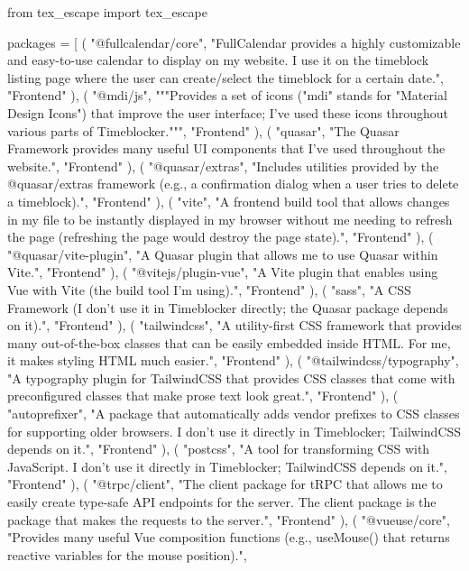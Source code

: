 \documentclass[12pt]{report}
\begin{document}
\begin{pycode}
from tex_escape import tex_escape

packages = [
	(
		"@fullcalendar/core",
		"FullCalendar provides a highly customizable and easy-to-use calendar to display on my website. I use it on the timeblock listing page where the user can create/select the timeblock for a certain date.",
		"Frontend"
	),
	(
		"@mdi/js",
		"""Provides a set of icons ("mdi" stands for "Material Design Icons") that improve the user interface; I've used these icons throughout various parts of Timeblocker.""",
		"Frontend"
	),
	(
		"quasar",
		"The Quasar Framework provides many useful UI components that I've used throughout the website.",
		"Frontend"
	),
	(
		"@quasar/extras",
		"Includes utilities provided by the @quasar/extras framework (e.g., a confirmation dialog when a user tries to delete a timeblock).",
		"Frontend"
	),
	(
		"vite",
		"A frontend build tool that allows changes in my file to be instantly displayed in my browser without me needing to refresh the page (refreshing the page would destroy the page state).",
		"Frontend"
	),
	(
		"@quasar/vite-plugin",
		"A Quasar plugin that allows me to use Quasar within Vite.",
		"Frontend"
	),
	(
		"@vitejs/plugin-vue",
		"A Vite plugin that enables using Vue with Vite (the build tool I'm using).",
		"Frontend"
	),
	(
		"sass",
		"A CSS Framework (I don't use it in Timeblocker directly; the Quasar package depends on it).",
		"Frontend"
	),
	(
		"tailwindcss",
		"A utility-first CSS framework that provides many out-of-the-box classes that can be easily embedded inside HTML. For me, it makes styling HTML much easier.",
		"Frontend"
	),
	(
		"@tailwindcss/typography",
		"A typography plugin for TailwindCSS that provides CSS classes that come with preconfigured classes that make prose text look great.",
		"Frontend"
	),
	(
		"autoprefixer",
		"A package that automatically adds vendor prefixes to CSS classes for supporting older browsers. I don't use it directly in Timeblocker; TailwindCSS depends on it.",
		"Frontend"
	),
	(
		"postcss",
		"A tool for transforming CSS with JavaScript. I don't use it directly in Timeblocker; TailwindCSS depends on it.",
		"Frontend"
	),
	(
		"@trpc/client",
		"The client package for tRPC that allows me to easily create type-safe API endpoints for the server. The client package is the package that makes the requests to the server.",
		"Frontend"
	),
	(
		"@vueuse/core",
		"Provides many useful Vue composition functions (e.g., useMouse() that returns reactive variables for the mouse position).",

\end{pycode}
\end{document}
